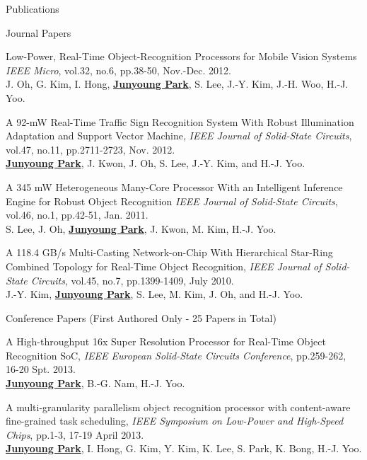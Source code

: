 \documentclass{resume} %
\begin{document}
\begin{section}{Publications}
\begin{subsection}{Journal Papers}{}{}{}
\item Low-Power, Real-Time Object-Recognition Processors for Mobile Vision Systems \emph{IEEE Micro}, vol.32, no.6, pp.38-50, Nov.-Dec. 2012. \\
{\small J. Oh, G. Kim, I. Hong, \underline{\bf Junyoung Park}, S. Lee, J.-Y. Kim, J.-H. Woo, H.-J. Yoo.}

\item A 92-mW Real-Time Traffic Sign Recognition System With Robust Illumination Adaptation and Support Vector Machine, \emph{IEEE Journal of Solid-State Circuits}, vol.47, no.11, pp.2711-2723, Nov. 2012. \\
{\small \underline{\bf Junyoung Park}, J. Kwon, J. Oh, S. Lee, J.-Y. Kim, and H.-J. Yoo.}

\item A 345 mW Heterogeneous Many-Core Processor With an Intelligent Inference Engine for Robust Object Recognition \emph{IEEE Journal of Solid-State Circuits}, vol.46, no.1, pp.42-51, Jan. 2011. \\
{\small S. Lee, J. Oh, \underline{\bf Junyoung Park}, J. Kwon, M. Kim, H.-J. Yoo.}

\item A 118.4 GB/s Multi-Casting Network-on-Chip With Hierarchical Star-Ring Combined Topology for Real-Time Object Recognition, \emph{IEEE Journal of Solid-State Circuits}, vol.45, no.7, pp.1399-1409, July 2010. \\
{\small J.-Y. Kim, \underline{\bf Junyoung Park}, S. Lee, M. Kim, J. Oh, and H.-J. Yoo.}

\end{subsection}

\begin{subsection}{Conference Papers (First Authored Only - 25 Papers in Total)}{}{}{}

\item A High-throughput 16x Super Resolution Processor for Real-Time Object Recognition SoC, \emph{IEEE European Solid-State Circuits Conference}, pp.259-262, 16-20 Spt. 2013. \\
{\small \underline{\bf Junyoung Park}, B.-G. Nam, H.-J. Yoo.}

\item A multi-granularity parallelism object recognition processor with content-aware fine-grained task scheduling, \emph{IEEE Symposium on Low-Power and High-Speed Chips}, pp.1-3, 17-19 April 2013. \\
{\small \underline{\bf Junyoung Park}, I. Hong, G. Kim, Y. Kim, K. Lee, S. Park, K. Bong, H.-J. Yoo.}


\end{subsection}
\end{section}
\end{document}
